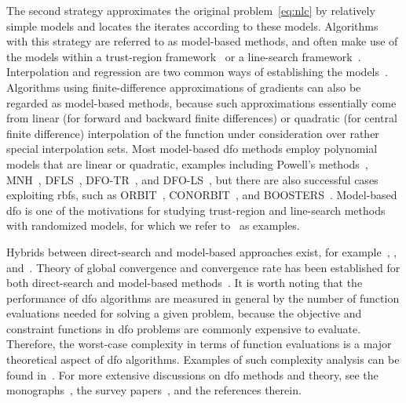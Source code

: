 \documentclass[11pt,draft]{article}
\numberwithin{equation}{section}
\begin{document}
The second strategy approximates the original problem~\cref{eq:nlc} by relatively simple models and locates the iterates according to these models.
Algorithms with this strategy are referred to as model-based methods, and often make use of the models within a trust-region framework~\cite{Conn_Gould_Toint_2000,Conn_Scheinberg_Vicente_2009a,Yuan_2015} or a line-search framework~\cite{Berahas_Byrd_Nocedal_2019,Shi_Etal_2022}.
Interpolation and regression are two common ways of establishing the models~\cite{Powell_2001,Powell_2004a,Conn_Scheinberg_Vicente_2008a,Conn_Scheinberg_Vicente_2008a,Wild_Regis_Shoemaker_2008,Bandeira_Scheinberg_Vicente_2012,Billups_Larson_Graf_2013,Regis_Wild_2017}.
Algorithms using finite-difference approximations of gradients can also be regarded as model-based methods, because such approximations essentially come from linear (for forward and backward finite differences) or quadratic (for central finite difference) interpolation of the function under consideration over rather special interpolation sets.
Most model-based \gls{dfo} methods employ polynomial models that are linear or quadratic, examples including
Powell's methods~\cite{Powell_1994,Powell_2002,Powell_2006,Powell_2009}, MNH~\cite{Wild_2008}, DFLS~\cite{Zhang_Conn_Scheinberg_2010}, DFO-TR~\cite{Bandeira_Scheinberg_Vicente_2012}, and DFO-LS~\cite{Cartis_Etal_2019}, but there are also successful cases exploiting \glspl{rbf}, such as ORBIT~\cite{Wild_Regis_Shoemaker_2008}, CONORBIT~\cite{Regis_Wild_2017}, and BOOSTERS~\cite{Oeuvray_Bierlaire_2009}.
Model-based \gls{dfo} is one of the motivations for studying trust-region and line-search methods with randomized models, for which we refer to~\cite{Bandeira_Scheinberg_Vicente_2014,Gratton_Etal_2018,Cartis_Scheinberg_2018} as examples.

Hybrids between direct-search and model-based approaches exist, for
example~\cite{Custodio_Vicente_2007}, \cite[Algorithm~4.7]{Kelley_2011},
and~\cite{Conn_Digabel_2013}. Theory of global convergence and convergence rate has been established
for both direct-search and model-based
methods~\cite{Torczon_1997,Conn_Scheinberg_Toint_1997a,Kolda_Lewis_Torczon_2003,Conn_Scheinberg_Vicente_2009a,
Powell_2012,Vicente_2013,Dodangeh_Vicente_2016,Garmanjani_Judice_Vicente_2016,Gratton_Royer_Vicente_2020}.
It is worth noting that the performance of
\gls{dfo} algorithms are measured in general by the number of function evaluations needed for solving
a given problem, because the objective and constraint functions in \gls{dfo} problems are commonly
expensive to evaluate. Therefore, the worst-case complexity in terms of function evaluations is a major
theoretical aspect of \gls{dfo} algorithms. Examples of such complexity analysis can be found
in~\cite{Vicente_2013,Gratton_Etal_2015,Dodangeh_Vicente_2016,Dodangeh_Vicente_Zhang_2016}.
For more extensive discussions on \gls{dfo} methods and theory, see the
monographs~\cite{Conn_Scheinberg_Vicente_2009b,Audet_Hare_2017}, the survey
papers~\cite{Rios_Sahinidis_2013, Custodio_Scheinberg_Vicente_2017, Larson_Menickelly_Wild_2019},
and the references therein.
\end{document}
